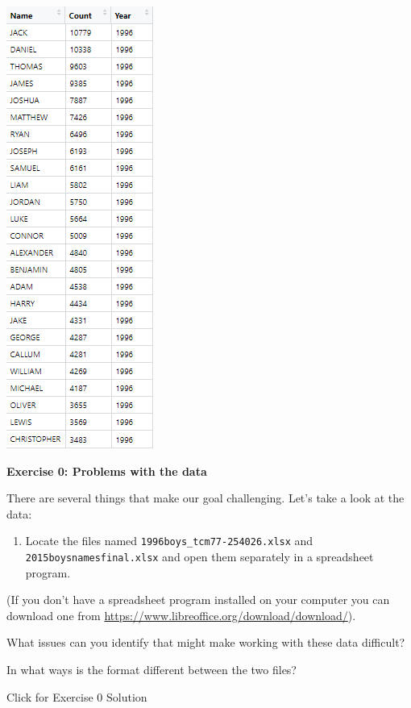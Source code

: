 \documentclass[
]{book}
\providecommand{\tightlist}{%
  \setlength{\itemsep}{0pt}\setlength{\parskip}{0pt}}
\begin{document}
\includegraphics{R/RDataWrangling/images/goal.png}

\textbf{Exercise 0: Problems with the data}

There are several things that make our goal challenging. Let's take a look at the data:

\begin{enumerate}
\def\labelenumi{\arabic{enumi}.}
\tightlist
\item
  Locate the files named \texttt{1996boys\_tcm77-254026.xlsx} and \texttt{2015boysnamesfinal.xlsx} and open them separately in a spreadsheet program.
\end{enumerate}

(If you don't have a spreadsheet program installed on your computer you can download one from \url{https://www.libreoffice.org/download/download/}).

What issues can you identify that might make working with these data difficult?

In what ways is the format different between the two files?

{Click for Exercise 0 Solution}
\end{document}
